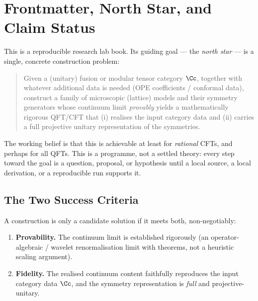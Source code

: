 
\section{Frontmatter, North Star, and Claim Status}
\label{sec:frontmatter}

This is a reproducible research lab book. Its guiding goal --- the
\emph{north star} --- is a single, concrete construction problem:

\begin{quote}
Given a (unitary) fusion or modular tensor category $\Cc$, together with whatever
additional data is needed (OPE coefficients / conformal data), construct a family
of microscopic (lattice) models and their symmetry generators whose continuum
limit \emph{provably} yields a mathematically rigorous QFT/CFT that (i) realises
the input category data and (ii) carries a full projective unitary representation
of the symmetries.
\end{quote}

The working belief is that this is achievable at least for \emph{rational} CFTs,
and perhaps for all QFTs. This is a programme, not a settled theory: every step
toward the goal is a question, proposal, or hypothesis until a local source, a
local derivation, or a reproducible run supports it.

\subsection{The Two Success Criteria}

A construction is only a candidate solution if it meets both, non-negotiably:

\begin{enumerate}
  \item \textbf{Provability.} The continuum limit is established rigorously
  (an operator-algebraic / wavelet renormalisation limit with theorems, not a
  heuristic scaling argument).
  \item \textbf{Fidelity.} The realised continuum content faithfully reproduces
  the input category data $\Cc$, and the symmetry representation is \emph{full}
  and projective-unitary.
\end{enumerate}

